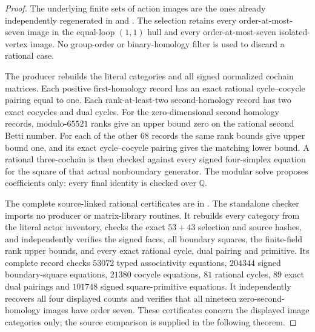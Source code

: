 \begin{proof}
The underlying finite sets of action images are
the ones already independently regenerated in
and
.
The selection retains every order-at-most-seven
image in the equal-loop $(1,1)$ hull and every
order-at-most-seven isolated-vertex image.
No group-order or binary-homology filter is used
to discard a rational case.

The producer
rebuilds the literal categories and all signed
normalized cochain matrices.  Each positive
first-homology record has an exact rational
cycle--cocycle pairing equal to one.
Each rank-at-least-two second-homology record has
two exact cocycles and dual cycles.
For the zero-dimensional second homology records,
modulo-$65521$ ranks give an upper bound zero
on the rational second Betti number.
For each of the other $68$ records the same
rank bounds give upper bound one, and its exact
cycle--cocycle pairing gives the matching lower
bound.  A rational three-cochain is then checked
against every signed four-simplex equation for
the square of that actual nonboundary generator.
The modular solve proposes coefficients only:
every final identity is checked over $\mathbb Q$.

The complete source-linked rational certificates
are in
.
The standalone checker
imports no producer or matrix-library routines.
It rebuilds every category from the literal actor inventory,
checks the exact $53+43$ selection and source hashes,
and independently verifies the signed faces, all boundary
squares, the finite-field rank upper bounds, and every
exact rational cycle, dual pairing and primitive.
Its complete record
checks $53072$ typed associativity equations,
$204344$ signed boundary-square equations,
$21380$ cocycle equations, $81$ rational cycles,
$89$ exact dual pairings and $101748$ signed
square-primitive equations.  It independently recovers
all four displayed counts and verifies that all nineteen
zero-second-homology images have order seven.
These certificates concern the displayed image
categories only; the source comparison is supplied
in the following theorem.
\end{proof}

